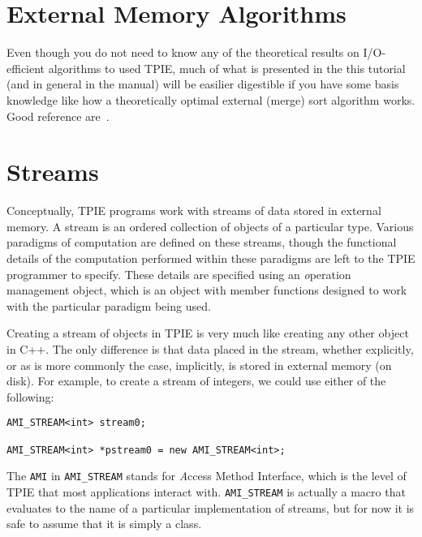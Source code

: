 \section{External Memory Algorithms}

Even though you do not need to know any of the theoretical results on
I/O-efficient algorithms to used TPIE, much of what is presented in the
this tutorial (and in general in the manual) will be easilier digestible if
you have some basis knowledge like how a theoretically optimal external
(merge) sort algorithm works. Good reference
are~\cite{aggarwal:input,vitter:podssurvey,arge:gisbook}.


\section{Streams}


Conceptually, TPIE programs work with streams of data stored in external
memory. A stream is an ordered collection of objects of a particular type.
Various paradigms of computation are defined on these streams, though the
functional details of the computation performed within these paradigms are
left to the TPIE programmer to specify. These details are specified using
an {\emph operation management object},
which is an object with member functions designed to work with the
particular paradigm being used.

Creating a stream of objects in TPIE is very much like creating any other
object in C++. The only difference is that data placed in the stream,
whether explicitly, or as is more commonly the case, implicitly, is stored
in external memory (on disk). For example, to create a stream of integers,
we could use either of the following:
\begin{verbatim}
AMI_STREAM<int> stream0;

AMI_STREAM<int> *pstream0 = new AMI_STREAM<int>;
\end{verbatim}

The {\tt AMI} in {\tt AMI\_STREAM} stands for {\emph Access Method
Interface}, which is the level of TPIE that
most applications interact with. {\tt AMI\_STREAM} is actually a macro that
evaluates to the name of a particular implementation of streams, but for
now it is safe to assume that it is simply a class.

